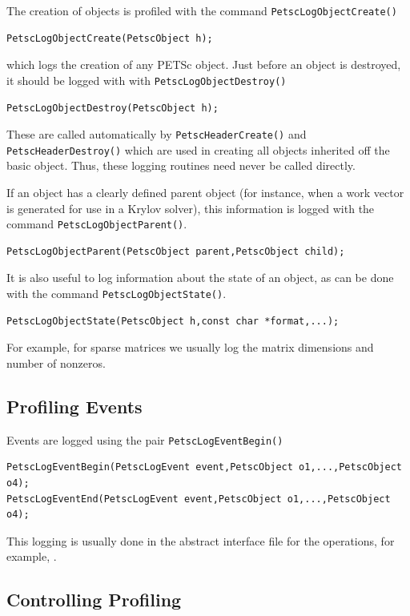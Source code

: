The creation of objects is profiled with the command
 \lstinline{PetscLogObjectCreate()}
\begin{lstlisting}
PetscLogObjectCreate(PetscObject h);
\end{lstlisting}
which logs the creation of any PETSc object.
Just before an object is destroyed, it should be  logged with
with \lstinline{PetscLogObjectDestroy()}
\begin{lstlisting}
PetscLogObjectDestroy(PetscObject h);
\end{lstlisting}
These are called automatically by \lstinline{PetscHeaderCreate()} and
\lstinline{PetscHeaderDestroy()} which are used in creating all objects
inherited off the basic object. Thus, these logging routines need
never be called directly.

If an object has a clearly defined parent object (for instance, when
a work vector is generated for use in a Krylov solver), this information
is logged with the command \lstinline{PetscLogObjectParent()}.
\begin{lstlisting}
PetscLogObjectParent(PetscObject parent,PetscObject child);
\end{lstlisting}
It is also useful to log information about the state of an object, as can
be done with the command \lstinline{PetscLogObjectState()}.
\begin{lstlisting}
PetscLogObjectState(PetscObject h,const char *format,...);
\end{lstlisting}

For example, for sparse matrices we usually log the matrix
dimensions and number of nonzeros.

\subsection{Profiling Events}

Events are logged using the
pair \lstinline{PetscLogEventBegin()}
\begin{lstlisting}
PetscLogEventBegin(PetscLogEvent event,PetscObject o1,...,PetscObject o4);
PetscLogEventEnd(PetscLogEvent event,PetscObject o1,...,PetscObject o4);
\end{lstlisting}
This logging is usually done in the abstract
interface file for the operations, for example, \href{http://www.mcs.anl.gov/petsc/petsc-master/src/mat/interface/matrix.c.html}{}.

\subsection{Controlling Profiling}

